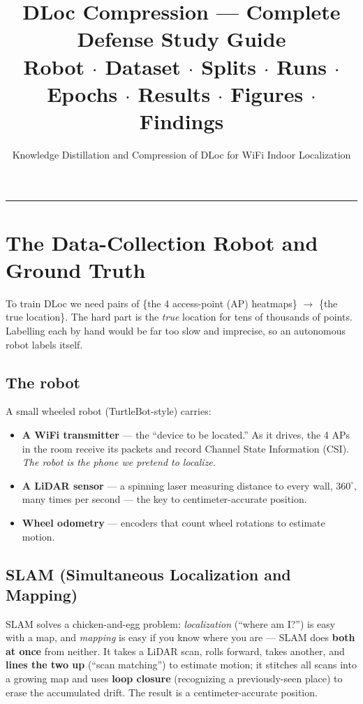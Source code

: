 \documentclass[11pt]{article}
\title{\textbf{DLoc Compression --- Complete Defense Study Guide}\\[2mm]
\large Robot $\cdot$ Dataset $\cdot$ Splits $\cdot$ Runs $\cdot$ Epochs $\cdot$
Results $\cdot$ Figures $\cdot$ Findings}
\author{Knowledge Distillation and Compression of DLoc for WiFi Indoor Localization}
\date{}
\begin{document}
\maketitle
\tableofcontents
\vspace{3mm}\hrule\vspace{3mm}

\section{The Data-Collection Robot and Ground Truth}

To train DLoc we need pairs of \{the 4 access-point (AP) heatmaps\} $\rightarrow$ \{the true
location\}. The hard part is the \emph{true} location for tens of thousands of points. Labelling each by
hand would be far too slow and imprecise, so an autonomous robot labels itself.

\subsection*{The robot}
A small wheeled robot (TurtleBot-style) carries:
\begin{itemize}[noitemsep]
  \item \textbf{A WiFi transmitter} --- the ``device to be located.'' As it drives, the 4 APs in the room
        receive its packets and record Channel State Information (CSI). \emph{The robot is the phone we
        pretend to localize.}
  \item \textbf{A LiDAR sensor} --- a spinning laser measuring distance to every wall, $360^\circ$, many
        times per second --- the key to centimeter-accurate position.
  \item \textbf{Wheel odometry} --- encoders that count wheel rotations to estimate motion.
\end{itemize}

\subsection*{SLAM (Simultaneous Localization and Mapping)}
SLAM solves a chicken-and-egg problem: \emph{localization} (``where am I?'') is easy with a map, and
\emph{mapping} is easy if you know where you are --- SLAM does \textbf{both at once} from neither. It
takes a LiDAR scan, rolls forward, takes another, and \textbf{lines the two up} (``scan matching'') to
estimate motion; it stitches all scans into a growing map and uses \textbf{loop closure} (recognizing a
previously-seen place) to erase the accumulated drift. The result is a centimeter-accurate position.
\end{document}
